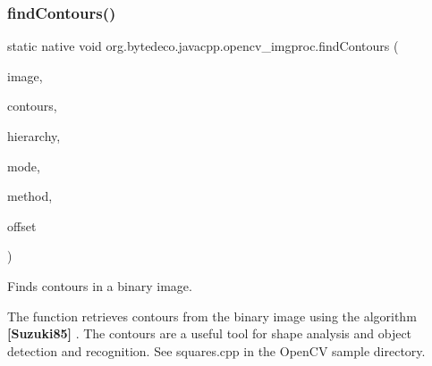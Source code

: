 \subsubsection{\texorpdfstring{find\+Contours()}{findContours()}\hspace{0.1cm}{\footnotesize\ttfamily [1/2]}}
{\footnotesize\ttfamily static native void org.\+bytedeco.\+javacpp.\+opencv\+\_\+imgproc.\+find\+Contours (\begin{DoxyParamCaption}\item[{@By\+Val Mat}]{image,  }\item[{@By\+Val Mat\+Vector}]{contours,  }\item[{@By\+Val Mat}]{hierarchy,  }\item[{int}]{mode,  }\item[{int}]{method,  }\item[{@By\+Val(null\+Value=\char`\"{}cv\+::\+Point()\char`\"{}) Point}]{offset }\end{DoxyParamCaption})\hspace{0.3cm}{\ttfamily [static]}}



Finds contours in a binary image. 

The function retrieves contours from the binary image using the algorithm {\bfseries [Suzuki85]} . The contours are a useful tool for shape analysis and object detection and recognition. See squares.\+cpp in the Open\+CV sample directory. 


